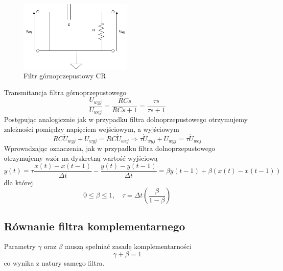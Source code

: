 \begin{figure}[htb!]
    \centering
    \includegraphics[width=0.5\textwidth]{Rysunki/Rozdzial04/FIltr_gornoprzepustowy.png}
    \caption{Filtr górnoprzepustowy CR}
    \label{filtr gp}
\end{figure}

Transmitancja filtra górnoprzepustowego
$$
    \frac{U_{wyj}}{U_{wej}} = \frac{RCs}{RCs + 1} = \frac{\tau s}{\tau s + 1}
$$
Postępując analogicznie jak w przypadku filtra dolnoprzepustowego otrzymujemy zależności pomiędzy napięciem wejściowym, a wyjściowym
$$
   RC\Dot{U}_{wyj} + U_{wyj} = RC\Dot{U}_{wej} \Rightarrow \tau\Dot{U}_{wyj} + U_{wyj} = \tau\Dot{U}_{wej} 
$$
Wprowadzając oznaczenia, jak w przypadku filtra dolnoprzepustowego otrzymujemy wzór na dyskretną wartość wyjściową
\begin{equation}
    y(t) = \tau\frac{x(t) - x(t-1)}{\Delta t} - \frac{y(t) - y(t-1)}{\Delta t}  = \beta y(t-1) + \beta(x(t) - x(t-1))
    \label{wyjscie gp}
\end{equation}
dla której
$$
    0 \leq \beta \leq 1,
    \quad
    \tau = \Delta t\left(\frac{\beta}{1 - \beta}\right)
$$

\subsection{Równanie filtra komplementarnego}
Parametry $\gamma$ oraz $\beta$ muszą spełniać zasadę komplementarności
$$
    \gamma + \beta = 1
$$
co wynika z natury samego filtra.

